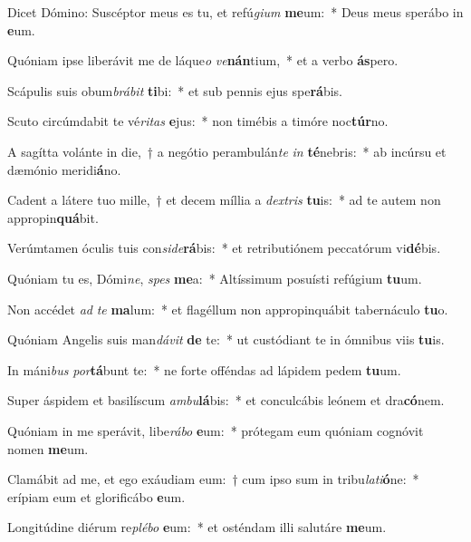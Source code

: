 \item Dicet Dómino: Suscéptor meus es tu, et refú\textit{gi}\textit{um} \textbf{me}um:~* Deus meus sperábo in \textbf{e}um.
\item Quóniam ipse liberávit me de láque\textit{o} \textit{ve}\textbf{nán}tium,~* et a verbo \textbf{ás}pero.
\item Scápulis suis obum\textit{brá}\textit{bit} \textbf{ti}bi:~* et sub pennis ejus spe\textbf{rá}bis.
\item Scuto circúmdabit te vé\textit{ri}\textit{tas} \textbf{e}jus:~* non timébis a timóre noc\textbf{túr}no.
\item A sagítta volánte in die,~† a negótio perambulán\textit{te} \textit{in} \textbf{té}nebris:~* ab incúrsu et dæmónio meridi\textbf{á}no.
\item Cadent a látere tuo mille,~† et decem míllia a \textit{dex}\textit{tris} \textbf{tu}is:~* ad te autem non appropin\textbf{quá}bit.
\item Verúmtamen óculis tuis con\textit{si}\textit{de}\textbf{rá}bis:~* et retributiónem peccatórum vi\textbf{dé}bis.
\item Quóniam tu es, Dómi\textit{ne}, \textit{spes} \textbf{me}a:~* Altíssimum posuísti refúgium \textbf{tu}um.
\item Non accédet \textit{ad} \textit{te} \textbf{ma}lum:~* et flagéllum non appropinquábit tabernáculo \textbf{tu}o.
\item Quóniam Angelis suis man\textit{dá}\textit{vit} \textbf{de} te:~* ut custódiant te in ómnibus viis \textbf{tu}is.
\item In máni\textit{bus} \textit{por}\textbf{tá}bunt te:~* ne forte offéndas ad lápidem pedem \textbf{tu}um.
\item Super áspidem et basilíscum \textit{am}\textit{bu}\textbf{lá}bis:~* et conculcábis leónem et dra\textbf{có}nem.
\item Quóniam in me sperávit, libe\textit{rá}\textit{bo} \textbf{e}um:~* prótegam eum quóniam cognóvit nomen \textbf{me}um.
\item Clamábit ad me, et ego exáudiam eum:~† cum ipso sum in tribu\textit{la}\textit{ti}\textbf{ó}ne:~* erípiam eum et glorificábo \textbf{e}um.
\item Longitúdine diérum re\textit{plé}\textit{bo} \textbf{e}um:~* et osténdam illi salutáre \textbf{me}um.
